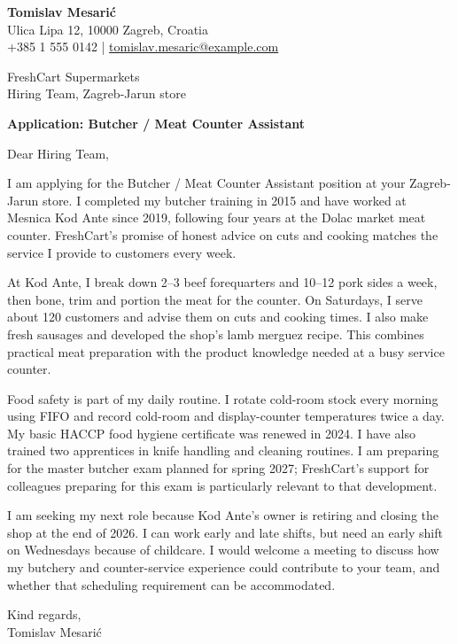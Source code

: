 \documentclass[11pt,a4paper]{article}
\begin{document}
{\large\bfseries\color{primarycolor} Tomislav Mesarić}\\
Ulica Lipa 12, 10000 Zagreb, Croatia\\
+385 1 555 0142 | \href{mailto:tomislav.mesaric@example.com}{tomislav.mesaric@example.com}

FreshCart Supermarkets\\
Hiring Team, Zagreb-Jarun store

\textbf{Application: Butcher / Meat Counter Assistant}

Dear Hiring Team,

I am applying for the Butcher / Meat Counter Assistant position at your Zagreb-Jarun store. I completed my butcher training in 2015 and have worked at Mesnica Kod Ante since 2019, following four years at the Dolac market meat counter. FreshCart's promise of honest advice on cuts and cooking matches the service I provide to customers every week.

At Kod Ante, I break down 2–3 beef forequarters and 10–12 pork sides a week, then bone, trim and portion the meat for the counter. On Saturdays, I serve about 120 customers and advise them on cuts and cooking times. I also make fresh sausages and developed the shop's lamb merguez recipe. This combines practical meat preparation with the product knowledge needed at a busy service counter.

Food safety is part of my daily routine. I rotate cold-room stock every morning using FIFO and record cold-room and display-counter temperatures twice a day. My basic HACCP food hygiene certificate was renewed in 2024. I have also trained two apprentices in knife handling and cleaning routines. I am preparing for the master butcher exam planned for spring 2027; FreshCart's support for colleagues preparing for this exam is particularly relevant to that development.

I am seeking my next role because Kod Ante's owner is retiring and closing the shop at the end of 2026. I can work early and late shifts, but need an early shift on Wednesdays because of childcare. I would welcome a meeting to discuss how my butchery and counter-service experience could contribute to your team, and whether that scheduling requirement can be accommodated.

Kind regards,\\
Tomislav Mesarić
\end{document}

